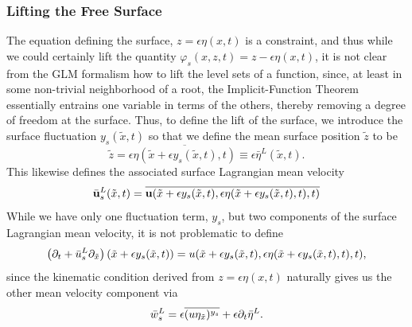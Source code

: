 \documentclass{JFM_Style/jfm}
\begin{document}
\subsubsection*{Lifting the Free Surface}
The equation defining the surface, $z=\epsilon\eta(x,t)$ is a constraint, and thus while we could certainly lift the quantity $\varphi_{s}(x,z,t)=z-\epsilon\eta(x,t)$, it is not clear from the GLM formalism how to lift the level sets of a function, since, at least in some non-trivial neighborhood of a root, the Implicit-Function Theorem essentially entrains one variable in terms of the others, thereby removing a degree of freedom at the surface.  Thus, to define the lift of the surface, we introduce the surface fluctuation $y_{s}(\tilde{x},t)$ so that we define the mean surface position $\tilde{z}$ to be 
\[
\tilde{z} = \epsilon \overline{\eta(\tilde{x}+\epsilon y_{s}(\tilde{x},t),t)}\equiv \epsilon \bar{\eta}^{L}(\tilde{x},t).
\]
This likewise defines the associated surface Lagrangian mean velocity
\[
\bar{{\bf u}}^{L}_{s}(\tilde{x},t) = \overline{{\bf u}(\tilde{x}+\epsilon y_{s}(\tilde{x},t),\epsilon\eta(\tilde{x}+\epsilon y_{s}(\tilde{x},t),t),t)}
\]
While we have only one fluctuation term, $y_{s}$, but two components of the surface Lagrangian mean velocity, it is not problematic to define
\[
\left(\partial_{t} +\bar{u}^{L}_{s}\partial_{\tilde x}\right)(\tilde{x}+\epsilon y_{s}(\tilde{x},t) )= u(\tilde{x}+\epsilon y_{s}(\tilde{x},t),\epsilon\eta(\tilde{x}+\epsilon y_{s}(\tilde{x},t),t),t),
\]
since the kinematic condition derived from $z=\epsilon \eta(x,t)$ naturally gives us the other mean velocity component via 
\[
\bar{w}^{L}_{s} = \epsilon \overline{(u\eta_{\tilde{x}})^{y_{s}}} + \epsilon \partial_{t}\bar{\eta}^{L}.
\]
\end{document}
